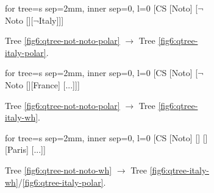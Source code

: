\begin{figure}[H]
\centering
\setlength{\fboxsep}{1pt}
\renewcommand\thefigure{\ref{fig6:qtrees-hc-sw}}
\begin{subfigure}[b]{.22\linewidth}
	\centering
	\scalebox{.7}
	{\begin{forest}for tree={s sep=2mm, inner sep=0, l=0}
			[CS [{Noto}] [{$\neg$Noto} [][$\neg$Italy]]]
	\end{forest}}
	\caption{Tree \ref{fig6:qtree-not-noto-polar} $\rightarrow$ Tree \ref{fig6:qtree-italy-polar}.}\label{fig6:tree-hc-sw-polar-polar-2}
\end{subfigure}\hfill
\begin{subfigure}[b]{.22\linewidth}
	\centering
	\scalebox{.7}
	{\begin{forest}for tree={s sep=2mm, inner sep=0, l=0}
			[CS [{Noto}] [{$\neg$Noto} [][France] [...]]]
	\end{forest}}
	\caption{Tree \ref{fig6:qtree-not-noto-polar} $\rightarrow$ Tree \ref{fig6:qtree-italy-wh}.}\label{fig6:tree-hc-sw-polar-wh-2}
\end{subfigure}\hfill
\begin{subfigure}[b]{.3\linewidth}
	\centering
	\scalebox{.7}
	{\begin{forest}for tree={s sep=2mm, inner sep=0, l=0}
			[CS [{Noto}] [] [] [{Paris}] [...]]
	\end{forest}}
	\caption{Tree \ref{fig6:qtree-not-noto-wh} $\rightarrow$ Tree \ref{fig6:qtree-italy-wh}/\ref{fig6:qtree-italy-polar}.}\label{fig6:qtree-if-not-noto-italy-wh-wh-2}\label{fig6:tree-hc-sw-wh-2}
\end{subfigure}\hfill
\begin{subfigure}[b]{.25\linewidth}

\end{subfigure}
\end{figure}
